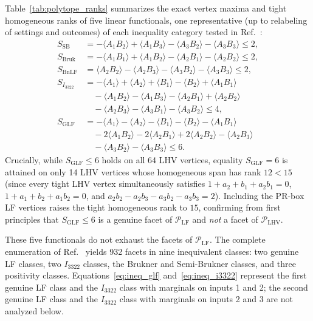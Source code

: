 Table~\ref{tab:polytope_ranks} summarizes the exact vertex maxima and tight homogeneous ranks of five linear functionals, one representative (up to relabeling of settings and outcomes) of each inequality category tested in Ref.~\cite{bong2020}:
\begin{align}
    S_{\mathrm{SB}} &= -\langle A_1 B_2 \rangle + \langle A_1 B_3 \rangle - \langle A_3 B_2 \rangle - \langle A_3 B_3 \rangle \le 2, \label{eq:ineq_sb} \\
    S_{\mathrm{Bruk}} &= -\langle A_1 B_1 \rangle + \langle A_1 B_2 \rangle - \langle A_2 B_1 \rangle - \langle A_2 B_2 \rangle \le 2, \label{eq:ineq_bruk} \\
    S_{\mathrm{BnLF}} &= \langle A_2 B_2 \rangle - \langle A_2 B_3 \rangle - \langle A_3 B_2 \rangle - \langle A_3 B_3 \rangle \le 2, \label{eq:ineq_bnlf} \\
    S_{I_{3322}} &= -\langle A_1 \rangle + \langle A_2 \rangle + \langle B_1 \rangle - \langle B_2 \rangle + \langle A_1 B_1 \rangle \nonumber \\
    &\quad - \langle A_1 B_2 \rangle - \langle A_1 B_3 \rangle - \langle A_2 B_1 \rangle + \langle A_2 B_2 \rangle \nonumber \\
    &\quad - \langle A_2 B_3 \rangle - \langle A_3 B_1 \rangle - \langle A_3 B_2 \rangle \le 4, \label{eq:ineq_i3322} \\
    S_{\mathrm{GLF}} &= -\langle A_1 \rangle - \langle A_2 \rangle - \langle B_1 \rangle - \langle B_2 \rangle - \langle A_1 B_1 \rangle \nonumber \\
    &\quad - 2\langle A_1 B_2 \rangle - 2\langle A_2 B_1 \rangle + 2\langle A_2 B_2 \rangle - \langle A_2 B_3 \rangle \nonumber \\
    &\quad - \langle A_3 B_2 \rangle - \langle A_3 B_3 \rangle \le 6. \label{eq:ineq_glf}
\end{align}
Crucially, while $S_{\mathrm{GLF}} \le 6$ holds on all 64 LHV vertices, equality $S_{\mathrm{GLF}} = 6$ is attained on only 14 LHV vertices whose homogeneous span has rank $12 < 15$ (since every tight LHV vertex simultaneously satisfies $1 + a_2 + b_1 + a_2 b_1 = 0$, $1 + a_1 + b_2 + a_1 b_2 = 0$, and $a_2 b_2 - a_2 b_3 - a_3 b_2 - a_3 b_3 = 2$). Including the PR-box LF vertices raises the tight homogeneous rank to $15$, confirming from first principles that $S_{\mathrm{GLF}} \le 6$ is a genuine facet of $\mathcal{P}_{\mathrm{LF}}$ and \emph{not} a facet of $\mathcal{P}_{\mathrm{LHV}}$.

These five functionals do not exhaust the facets of $\mathcal{P}_{\mathrm{LF}}$. The complete enumeration of Ref.~\cite{bong2020} yields 932 facets in nine inequivalent classes: two genuine LF classes, two $I_{3322}$ classes, the Brukner and Semi-Brukner classes, and three positivity classes. Equations~\eqref{eq:ineq_glf} and~\eqref{eq:ineq_i3322} represent the first genuine LF class and the $I_{3322}$ class with marginals on inputs 1 and 2; the second genuine LF class and the $I_{3322}$ class with marginals on inputs 2 and 3 are not analyzed below.

